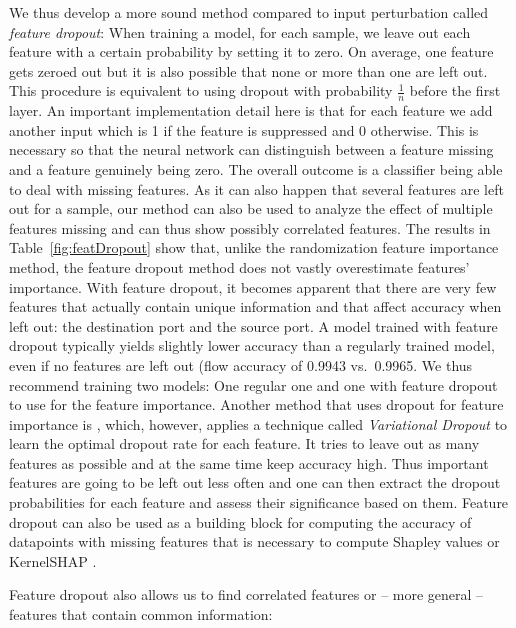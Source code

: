 \documentclass[conference]{IEEEtran}
\begin{document}
We thus develop a more sound method compared to input perturbation called \textit{feature dropout}: When training a model, for each sample, we leave out each feature with a certain probability by setting it to zero. On average, one feature gets zeroed out but it is also possible that none or more than one are left out. This procedure is equivalent to using dropout \cite{srivastava_dropout:_2014} with probability $\frac{1}{n}$ before the first layer. An important implementation detail here is that for each feature we add another input which is 1 if the feature is suppressed and 0 otherwise. This is necessary so that the neural network can distinguish between a feature missing and a feature genuinely being zero. The overall outcome is a classifier being able to deal with missing features. As it can also happen that several features are left out for a sample, our method can also be used to analyze the effect of multiple features missing and can thus show possibly correlated features. The results in Table~\ref{fig:featDropout} show that, unlike the randomization feature importance method, the feature dropout method does not vastly overestimate features' importance. With feature dropout, it becomes apparent that there are very few features that actually contain unique information and that affect accuracy when left out: the destination port and the source port. A model trained with feature dropout typically yields slightly lower accuracy than a regularly trained model, even if no features are left out (flow accuracy of 0.9943 vs.~0.9965. We thus recommend training two models: One regular one and one with feature dropout to use for the feature importance. Another method that uses dropout for feature importance is \cite{chang_dropout_2017}, which, however, applies a technique called \textit{Variational Dropout} to learn the optimal dropout rate for each feature. It tries to leave out as many features as possible and at the same time keep accuracy high. Thus important features are going to be left out less often and one can then extract the dropout probabilities for each feature and assess their significance based on them. Feature dropout can also be used as a building block for computing the accuracy of datapoints with missing features that is necessary to compute Shapley values \cite{shapley_value_1953} or KernelSHAP \cite{lundberg_unified_2017}.

Feature dropout also allows us to find correlated features or -- more general -- features that contain common information: 
\end{document}
